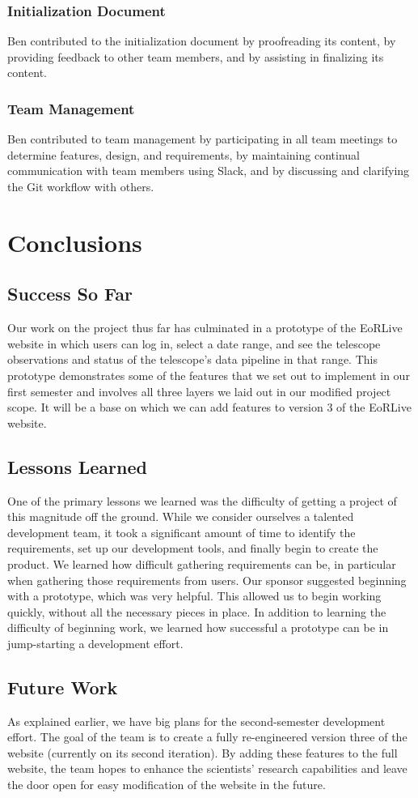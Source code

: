 \documentclass[12pt]{article}
\begin{document}
\begin{spacing}{1.5}
\subsubsection{Initialization Document}
Ben contributed to the initialization document by proofreading its content, by providing feedback to other team members, and by assisting in finalizing its content.
\subsubsection{Team Management}
Ben contributed to team management by participating in all team meetings to determine features, design, and requirements, by maintaining continual communication with team members using Slack, and by discussing and clarifying the Git workflow with others.

\clearpage

\section{Conclusions}
\subsection{Success So Far}
Our work on the project thus far has culminated in a prototype of the EoRLive website in which users can log in, select a date range, and see the telescope observations and status of the telescope's data pipeline in that range. This prototype demonstrates some of the features that we set out to implement in our first semester and involves all three layers we laid out in our modified project scope. It will be a base on which we can add features to version 3 of the EoRLive website.
\subsection{Lessons Learned}
One of the primary lessons we learned was the difficulty of getting a project of this magnitude off the ground. While we consider ourselves a talented development team, it took a significant amount of time to identify the requirements, set up our development tools, and finally begin to create the product. We learned how difficult gathering requirements can be, in particular when gathering those requirements from users. Our sponsor suggested beginning with a prototype, which was very helpful. This allowed us to begin working quickly, without all the necessary pieces in place. In addition to learning the difficulty of beginning work, we learned how successful a prototype can be in jump-starting a development effort.
\subsection{Future Work}
As explained earlier, we have big plans for the second-semester development effort. The goal of the team is to create a fully re-engineered version three of the website (currently on its second iteration). By adding these features to the full website, the team hopes to enhance the scientists' research capabilities and leave the door open for easy modification of the website in the future.

\end{spacing}
\end{document}
